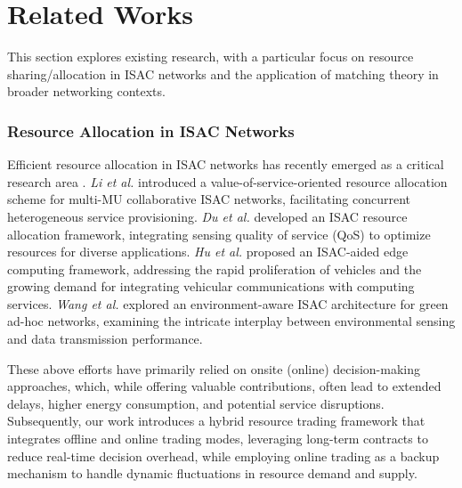 \section{Related Works}
This section explores existing research, with a particular focus on resource sharing/allocation in ISAC networks and the application of matching theory in broader networking contexts.


\subsubsection{Resource Allocation in ISAC Networks} Efficient resource allocation in ISAC networks has recently emerged as a critical research area \cite{RW ISAC1,RW ISAC2,RW ISAC3,RW ISAC4}. \textit{Li et al.} \cite{RW ISAC1} introduced a value-of-service-oriented resource allocation scheme for multi-MU collaborative ISAC networks, facilitating concurrent heterogeneous service provisioning. \textit{Du et al.} \cite{RW ISAC2} developed an ISAC resource allocation framework, integrating sensing quality of service (QoS) to optimize resources for diverse applications. \textit{Hu et al.}\cite{RW ISAC3} proposed an ISAC-aided edge computing framework, addressing the rapid proliferation of vehicles and the growing demand for integrating vehicular communications with computing services. \textit{Wang et al.}\cite{RW ISAC4} explored an environment-aware ISAC architecture for green ad-hoc networks, examining the intricate interplay between environmental sensing and data transmission performance.

These above efforts have primarily relied on onsite (online) decision-making approaches, which, while offering valuable contributions, often lead to extended delays, higher energy consumption, and potential service disruptions. Subsequently, our work introduces a hybrid resource trading framework that integrates offline and online trading modes, leveraging long-term contracts to reduce real-time decision overhead, while employing online trading as a backup mechanism to handle dynamic fluctuations in resource demand and supply. 

